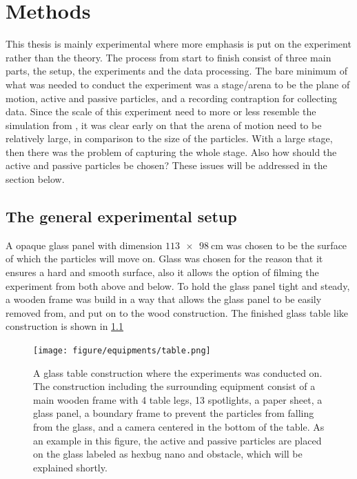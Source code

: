 \chapter{Methods}
This thesis is mainly experimental where more emphasis is put on the experiment 
rather than the theory. The process from start to finish consist of three main parts, the setup, 
the experiments and the data processing. The bare minimum of what was needed to conduct the experiment 
was a stage/arena to be the plane of motion, active and passive particles, and a recording contraption for collecting data. 
Since the scale of this experiment need to more or less resemble the simulation from \citeauthor{nilsson2017metastable}, 
it was clear early on that the arena of motion need to be relatively large, in comparison to the size of the particles. 
With a large stage, then there was the problem of capturing the whole stage. Also how should the active and passive particles 
be chosen? These issues will be addressed in the section below.

\section{The general experimental setup}

A opaque glass panel with dimension $\SI[product-units = single]{113 x 98}{\centi\metre}$ 
was chosen to be the surface of which the particles will move on. Glass was chosen for 
the reason that it ensures a hard and smooth surface, also it allows the option of 
filming the experiment from both above and below. To hold the glass panel tight and steady, 
a wooden frame was build in a way that allows the glass panel to be easily removed from, and 
put on to the wood construction. The finished glass table like construction is shown in \cref{fig:table}

\begin{figure}[htpb!]
    \centering
    \texttt{[image: figure/equipments/table.png]}
    \caption{A glass table construction where the experiments was conducted on. The construction including 
    the surrounding equipment consist of a main wooden frame with 4 table legs,  
    13 spotlights, a paper sheet, a glass panel, a boundary frame to prevent the particles from 
    falling from the glass, and a camera centered in the bottom of the table. As an example in this figure, 
    the active and passive particles are placed on the glass labeled as hexbug nano and obstacle, which 
    will be explained shortly.}
    \label{fig:table}
\end{figure}


